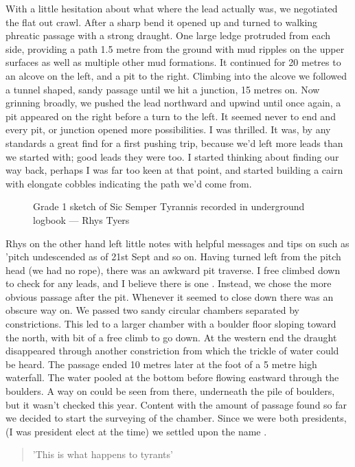 With a little hesitation about what where the lead actually was, we negotiated the flat out crawl. After a sharp bend it opened up and turned to walking phreatic passage with a strong draught. One large ledge protruded from each side, providing a path 1.5 metre from the ground with mud ripples on the upper surfaces as well as multiple other mud formations. It continued for 20 metres to an alcove on the left, and a pit to the right. Climbing into the alcove we followed a tunnel shaped, sandy passage until we hit a junction, 15 metres on. Now grinning broadly, we pushed the lead northward and upwind until once again, a pit appeared on the right before a turn to the left. It seemed never to end and every pit, or junction opened more possibilities. I was thrilled. It was, by any standards a great find for a first pushing trip, because we'd left more leads than we started with; good leads they were too. I started thinking about finding our way back, perhaps I was far too keen at that point, and started building a cairn with elongate cobbles indicating the path we'd come from. 

\begin{figure}[t!]
\checkoddpage \ifoddpage \forcerectofloat \else \forceversofloat \fi
\centering
{}
\caption{Grade 1 sketch of Sic Semper Tyrannis recorded in underground logbook --- Rhys Tyers}
\label{G1 sketch}
\end{figure}

Rhys on the other hand left little notes with helpful messages and tips on such as 'pitch undescended as of 21st Sept and so on. Having turned left from the pitch head (we had no rope), there was an awkward pit traverse. I free climbed down to check for any leads, and I believe there is one \sidenote. Instead, we chose the more obvious passage after the pit. Whenever it seemed to close down there was an obscure way on. We passed two sandy circular chambers separated by constrictions. This led to a larger chamber with a boulder floor sloping toward the north, with bit of a free climb to go down. At the western end the draught disappeared through another constriction from which the trickle of water could be heard. The passage ended 10 metres later at the foot of a 5 metre high waterfall. The water pooled at the bottom before flowing eastward through the boulders. A way on could be seen from there, underneath the pile of boulders, but it wasn't checked this year. Content with the amount of passage found so far we decided to start the surveying of the chamber. Since we were both presidents, (I was president elect at the time) we settled upon the name . 
\begin{quote} 'This is what happens to tyrants' \end{quote}


